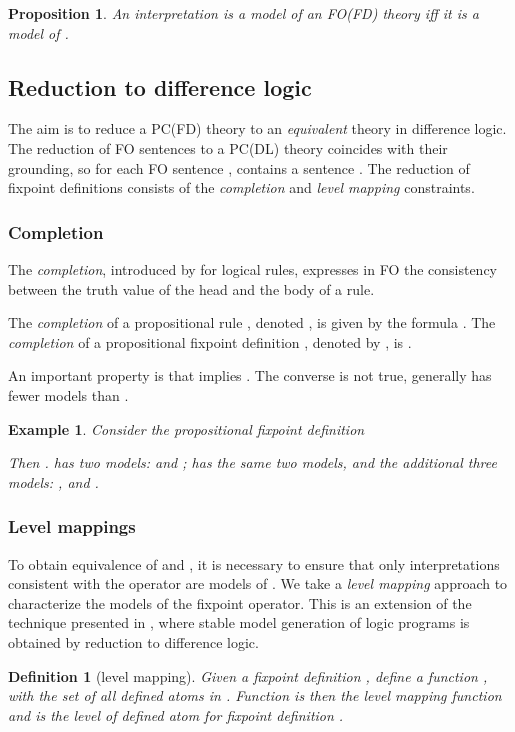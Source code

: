 \documentclass{tlp}
\newtheorem{proposition}[lemma]{Proposition}
\newtheorem{example}[lemma]{Example}
\newtheorem{definition}[lemma]{Definition}
\begin{document}
\begin{proposition}
An interpretation  is a model of an FO(FD) theory  iff it is a model of .
\end{proposition}

\subsection{Reduction to difference logic}
The aim is to reduce a PC(FD) theory  to an \emph{equivalent} theory  in difference logic. The reduction of FO sentences to a PC(DL) theory coincides with their grounding, so for each FO sentence ,  contains a sentence . The reduction of fixpoint definitions consists of the \emph{completion} and \emph{level mapping} constraints.

\subsubsection{Completion}
The \emph{completion}, introduced by \cite{adbt/Clark78} for logical rules, expresses in FO the consistency between the truth value of the head and the body of a rule.

The {\em completion} of a propositional rule , denoted , is given by the formula . The {\em completion} of a propositional fixpoint definition , denoted by , is .

An important property is that  implies . The converse is not true,  generally has fewer models than .

\begin{example}\label{ex:completionvsmodel}
Consider the propositional fixpoint definition 

Then .
 has two models:  and ;
 has the same two models, and the additional three
models: ,  and .
\end{example}

\subsubsection{Level mappings}
To obtain equivalence of  and , it is necessary to ensure that only interpretations consistent with the operator  are models of . We take a \emph{level mapping} approach to characterize the models of the fixpoint operator. This is an extension of the technique presented in \cite{lpnmr/JanhunenNS09,amai/Niemela08}, where stable model generation of logic programs is obtained by reduction to difference logic.

\begin{definition}[level mapping]
Given a fixpoint definition , define a function , with  the set of all defined atoms in . Function  is then the \emph{level mapping} function and  is the \emph{level} of defined atom  for fixpoint definition .
\end{definition}
\end{document}
